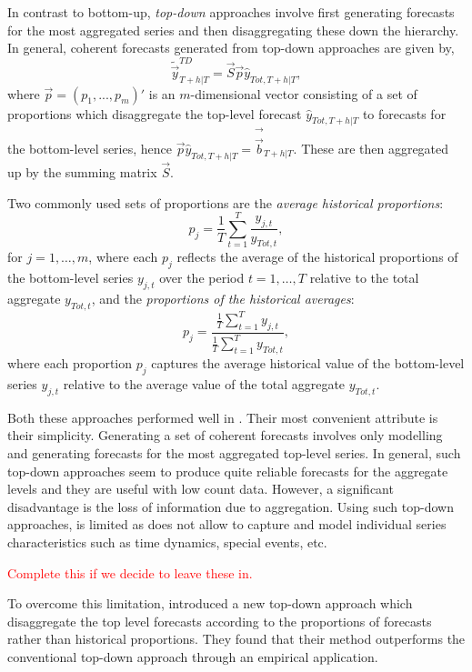 \documentclass[graybox]{svmult}
\begin{document}
In contrast to bottom-up, \textit{top-down} approaches involve first generating forecasts for the most aggregated series and then disaggregating these down the hierarchy. In general, coherent forecasts generated from top-down approaches are given by,
\begin{equation*}
\tilde{\vec{y}}^{TD}_{T+h|T}=\vec{S}\vec{p}\hat{y}_{Tot, T+h|T},
\end{equation*}
where $\vec{p} = (p_1,...,p_m)'$ is an $m$-dimensional vector consisting of a set of proportions which disaggregate the top-level forecast $\hat{y}_{Tot, T+h|T}$ to forecasts for the bottom-level series, hence $\vec{p}\hat{y}_{Tot, T+h|T}=\vec{\hat{\vec{b}}}_{T+h|T}$. These are then aggregated up by the summing matrix $\vec{S}$.

Two commonly used sets of proportions are the \textit{average historical proportions}:
\begin{equation*}
p_j = \frac{1}{T} \sum_{t=1}^{T}\frac{y_{j,t}}{y_{Tot,t}},
\end{equation*}
for $j=1,\ldots,m$, where each $p_j$ reflects the average of the historical proportions of the bottom-level series $y_{j,t}$ over the period $t=1,\ldots,T$ relative to the total aggregate $y_{Tot,t}$, and the \textit{proportions of the historical averages}:
\begin{equation}
p_j = \frac{\frac{1}{T}\sum_{t=1}^{T}y_{j,t}}{\frac{1}{T}\sum_{t=1}^{T}y_{Tot,t}},
\end{equation}
where each proportion $p_j$ captures the average historical value of the bottom-level series $y_{j,t}$ relative to the average value of the total aggregate $y_{Tot,t}$.

Both these approaches performed well in \cite{gross1990}. Their most convenient attribute is their simplicity. Generating a set of coherent forecasts involves only modelling and generating forecasts for the most aggregated top-level series. In general, such top-down approaches seem to produce quite reliable forecasts for the aggregate levels and they are useful with low count data. However, a significant disadvantage is the loss of information due to aggregation. Using such top-down approaches, is limited as does not allow to capture and model individual series characteristics such as time dynamics, special events, etc.

\textcolor{red}{Complete this if we decide to leave these in.}

To overcome this limitation, \cite{AthEtAl2009} introduced a new top-down approach which disaggregate the top level forecasts according to the proportions of forecasts rather than historical proportions. They found that their method outperforms the conventional top-down approach through an empirical application.
\end{document}
